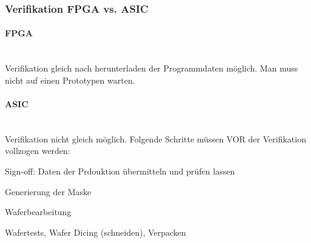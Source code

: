\subsubsection{Verifikation FPGA vs. ASIC}
\paragraph{FPGA}$~$ \\
Verifikation gleich nach herunterladen der Programmdaten möglich. Man muss nicht auf einen Prototypen warten.
\paragraph{ASIC}$~$ \\
Verifikation nicht gleich möglich. Folgende Schritte müssen VOR der Verifikation vollzogen werden:
\begin{compactitem}
        \item Sign-off: Daten der Prdouktion übermitteln und prüfen lassen
        \item Generierung der Maske
        \item Waferbearbeitung
        \item Wafertests, Wafer Dicing (schneiden), Verpacken
\end{compactitem}
